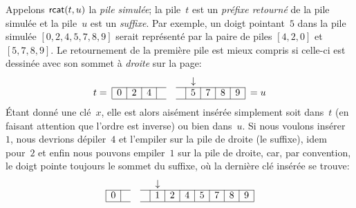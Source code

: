 Appelons \(\textsf{rcat}(t,u)\) la \emph{pile
simulée}; la pile~\(t\) est un
\emph{préfixe retourné} de la pile
simulée et la pile~\(u\) est un
\emph{suffixe}. Par exemple, un doigt
pointant~\(5\) dans la pile simulée \([0,2,4,5,7,8,9]\) serait
représenté par la paire de piles \([4,2,0]\) et \([5,7,8,9]\). Le
retournement de la première pile est mieux compris si celle-ci est
dessinée avec son sommet à \emph{droite} sur la page:
\begin{equation*}
\abovedisplayskip=0pt
\begin{array}{@{}r|c|c|c|ccc|c|c|c|c|l@{}}
  \multicolumn{1}{c}{} & \multicolumn{1}{c}{} & \multicolumn{1}{c}{}
& \multicolumn{1}{c}{} & \multicolumn{1}{c}{} & \multicolumn{1}{c}{}
& \multicolumn{1}{c}{} & \multicolumn{1}{c}{\downarrow}\\
\cline{2-5}\cline{7-11}
t = & 0 & 2 & 4 & & & & 5 & 7 & 8 & 9 & = u\\
\cline{2-5}\cline{7-11}
\end{array}
\end{equation*}
Étant donné une clé~\(x\), elle est alors aisément insérée simplement
soit dans~\(t\) (en faisant attention que l'ordre est inverse) ou bien
dans~\(u\). Si nous voulons insérer~\(1\), nous devrions dépiler~\(4\)
et l'empiler sur la pile de droite (le suffixe), idem pour~\(2\) et
enfin nous pouvons empiler~\(1\) sur la pile de droite, car, par
convention, le doigt pointe toujours le sommet du suffixe, où la
dernière clé insérée se trouve:
\begin{equation*}
\abovedisplayskip=0pt
\begin{array}{@{}|c|ccc|c|c|c|c|c|c|c|@{}}
  \multicolumn{1}{c}{} & \multicolumn{1}{c}{} & \multicolumn{1}{c}{}
& \multicolumn{1}{c}{} & \multicolumn{1}{c}{\downarrow}\\
\cline{1-2}\cline{4-11}
0 & & & & 1 & 2 & 4 & 5 & 7 & 8 & 9\\
\cline{1-2}\cline{4-11}
\end{array}
\end{equation*}

